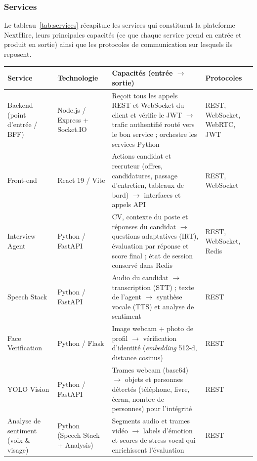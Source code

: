 \subsubsection{Services}

Le tableau~\ref{tab:services} récapitule les services qui constituent la plateforme NextHire, leurs principales capacités (ce que chaque service prend en entrée et produit en sortie) ainsi que les protocoles de communication sur lesquels ils reposent.

\begin{table}[H]
  \centering
  \footnotesize
  \setlength{\tabcolsep}{4pt}
  \renewcommand{\arraystretch}{1.35}
  \begin{tabularx}{\textwidth}{|>{\raggedright\arraybackslash}p{2.3cm}|>{\raggedright\arraybackslash}p{2.4cm}|>{\raggedright\arraybackslash}X|>{\raggedright\arraybackslash}p{2.2cm}|}
    \hline
    \textbf{Service} & \textbf{Technologie} & \textbf{Capacités (entrée $\rightarrow$ sortie)} & \textbf{Protocoles} \\
    \hline
    Backend (point d'entrée / BFF) & Node.js / Express + Socket.IO & Reçoit tous les appels REST et WebSocket du client et vérifie le JWT $\rightarrow$ trafic authentifié routé vers le bon service ; orchestre les services Python & REST, WebSocket, WebRTC, JWT \\
    \hline
    Front-end & React 19 / Vite & Actions candidat et recruteur (offres, candidatures, passage d'entretien, tableaux de bord) $\rightarrow$ interfaces et appels API & REST, WebSocket \\
    \hline
    Interview Agent & Python / FastAPI & CV, contexte du poste et réponses du candidat $\rightarrow$ questions adaptatives (IRT), évaluation par réponse et score final ; état de session conservé dans Redis & REST, WebSocket, Redis \\
    \hline
    Speech Stack & Python / FastAPI & Audio du candidat $\rightarrow$ transcription (STT) ; texte de l'agent $\rightarrow$ synthèse vocale (TTS) et analyse de sentiment & REST \\
    \hline
    Face Verification & Python / Flask & Image webcam + photo de profil $\rightarrow$ vérification d'identité (\textit{embedding} 512-d, distance cosinus) & REST \\
    \hline
    YOLO Vision & Python / FastAPI & Trames webcam (base64) $\rightarrow$ objets et personnes détectés (téléphone, livre, écran, nombre de personnes) pour l'intégrité & REST \\
    \hline
    Analyse de sentiment (voix \& visage) & Python (Speech Stack + Analysis) & Segments audio et trames vidéo $\rightarrow$ labels d'émotion et scores de stress vocal qui enrichissent l'évaluation & REST \\

\end{tabularx}
\end{table}
